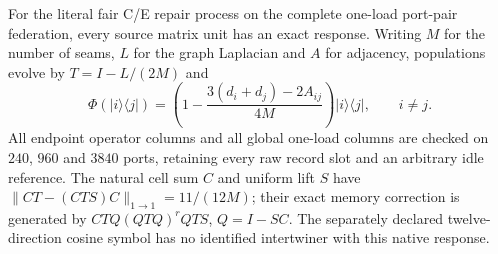 For the literal fair C/E repair process on the complete one-load
port-pair federation, every source matrix unit has an exact response.
Writing $M$ for the number of seams, $L$ for the graph Laplacian and
$A$ for adjacency, populations evolve by $T=I-L/(2M)$ and
\[
 \Phi(|i\rangle\langle j|)=
 \left(1-\frac{3(d_i+d_j)-2A_{ij}}{4M}\right)|i\rangle\langle j|,
 \qquad i\ne j.
\]
All endpoint operator columns and all global one-load columns are checked
on $240$, $960$ and $3840$ ports, retaining every raw record slot and an
arbitrary idle reference. The natural cell sum $C$ and uniform lift $S$
have $\|CT-(CTS)C\|_{1\to1}=11/(12M)$; their exact memory correction
is generated by $CTQ(QTQ)^rQTS$, $Q=I-SC$. The separately declared
twelve-direction cosine symbol has no identified intertwiner with this
native response.
